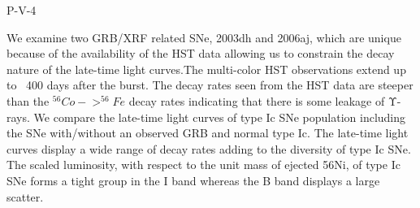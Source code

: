 P-V-4


\bigskip



\bigskip

\noindent We examine two GRB/XRF related SNe, 2003dh and 2006aj, which are unique because of the availability of the HST data allowing us to constrain the decay nature of the late-time light curves.The multi-color HST observations extend up to ~400 days after the burst. The decay rates seen from the HST data are steeper than the $^{56}Co->^{56}Fe$ decay rates indicating that there is some leakage of Υ-rays. We compare the late-time light curves of type Ic SNe population including the SNe with/without an observed GRB and normal type Ic. The late-time light curves display a wide range of decay rates adding to the diversity of type Ic SNe. The scaled luminosity, with respect to the unit mass of ejected 56Ni, of type Ic SNe forms a tight group in the I band whereas the B band displays a large scatter.
